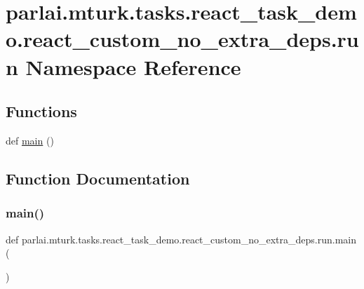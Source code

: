 \hypertarget{namespaceparlai_1_1mturk_1_1tasks_1_1react__task__demo_1_1react__custom__no__extra__deps_1_1run}{}\section{parlai.\+mturk.\+tasks.\+react\+\_\+task\+\_\+demo.\+react\+\_\+custom\+\_\+no\+\_\+extra\+\_\+deps.\+run Namespace Reference}
\label{namespaceparlai_1_1mturk_1_1tasks_1_1react__task__demo_1_1react__custom__no__extra__deps_1_1run}
\subsection*{Functions}
\begin{DoxyCompactItemize}
\item 
def \hyperlink{namespaceparlai_1_1mturk_1_1tasks_1_1react__task__demo_1_1react__custom__no__extra__deps_1_1run_a5ccd8dcc8c90287995d42dc7e0162a23}{main} ()
\end{DoxyCompactItemize}


\subsection{Function Documentation}
\mbox{\label{namespaceparlai_1_1mturk_1_1tasks_1_1react__task__demo_1_1react__custom__no__extra__deps_1_1run_a5ccd8dcc8c90287995d42dc7e0162a23}} 
\subsubsection{\texorpdfstring{main()}{main()}}
{\footnotesize\ttfamily def parlai.\+mturk.\+tasks.\+react\+\_\+task\+\_\+demo.\+react\+\_\+custom\+\_\+no\+\_\+extra\+\_\+deps.\+run.\+main (\begin{DoxyParamCaption}{ }\end{DoxyParamCaption})}

